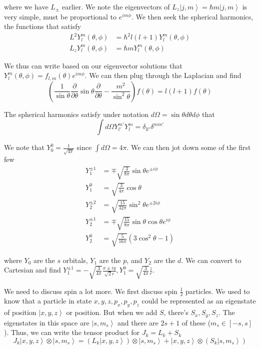 \documentclass[10pt]{report}
\newcommand{\ket}[1]{\left|#1\right>}
\newcommand{\pd}[2]{\frac{\partial #1}{\partial#2}}
\begin{document}
where we have $L_{\pm}$ earlier. We note the eigenvectors of $L_z\ket{j,m} = \hbar m \ket{j,m}$ is very simple, must be proportional to $e^{im\phi}$. We then seek the spherical harmonics, the functions that satisfy
\begin{align}
    L^2 Y_l^m\left( \theta,\phi \right) &= \hbar^2 l(l+1)Y_l^m(\theta,\phi)\\
    L_z Y_l^m\left( \theta,\phi \right) &= \hbar m Y_l^m(\theta,\phi)
\end{align}

We thus can write based on our eigenvector solutions that $Y_l^m(\theta,\phi) = f_{l,m}(\theta)e^{im\phi}$. We can then plug through the Laplacian and find
$$\left( \frac{1}{\sin\theta}\pd{}{\theta}\sin\theta\pd{}{\theta} - \frac{m^2}{\sin^2\theta} \right)f(\theta) = l(l+1)f(\theta)$$

The spherical harmonics satisfy under notation $d\Omega = \sin\theta d\theta d\phi$ that
$$\int d\Omega Y_{l'}^{m'}Y_{l}^{m} = \delta_{ll'}\delta^{mm'}$$

We note that $Y_0^0 = \frac{1}{\sqrt{4\pi}}$ since $\int d\Omega = 4\pi$. We can then jot down some of the first few
\begin{align}
    Y_1^{\pm 1} &= \mp \sqrt{\frac{3}{8\pi}}\sin\theta e^{\pm i\phi}\\
    Y_{1}^0 &= \sqrt{\frac{3}{4\pi}}\cos \theta\\
    Y_2^{\pm2} &= \sqrt{\frac{15}{32\pi}} \sin^2\theta e^{\pm2i\phi}\\
    Y_{2}^{\pm1} &= \mp \sqrt{\frac{15}{8\pi}} \sin \theta \cos \theta e^{i\phi}\\
    Y_2^0 &= \sqrt{\frac{5}{16\pi}}\left( 3\cos^2\theta - 1 \right)
\end{align}

where $Y_0$ are the $s$ orbitals, $Y_1$ are the $p$, and $Y_2$ are the $d$. We can convert to Cartesian and find $Y_1^{\pm1} = -\sqrt{\frac{3}{4\pi}}\frac{x\pm iy}{\sqrt{2}r}, Y_1^0 = \sqrt{\frac{3}{4\pi}}\frac{z}{r}$.

We need to discuss spin a lot more. We first discuss spin $\frac{1}{2}$ particles. We used to know that a particle in state $x,y,z,p_x, p_y, p_z$ could be represented as an eigenstate of position $\ket{x,y,z}$ or position. But when we add $S$, there's $S_x, S_y, S_z$. The eigenstates in this space are $\ket{s,m_s}$ and there are $2s+1$ of these ($m_s \in \left[ -s,s \right]$). Thus, we can write the tensor product for $J_k = L_k + S_k$
$$J_k\ket{x,y,z}\otimes \ket{s,m_s} = \left( L_k\ket{x,y,z} \right)\otimes \ket{s,m_s} + \ket{x,y,z}\otimes \left( S_k \ket{s,m_s} \right)$$
\end{document}
